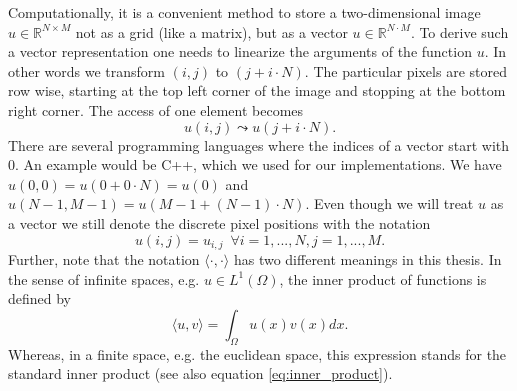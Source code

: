     Computationally, it is a convenient method to store a two-dimensional image $u \in \mathbb{R}^{N \times M}$ not as a grid (like a matrix), but as a vector $u \in \mathbb{R}^{N \cdot M}$. To derive such a vector representation one needs to linearize the arguments of the function $u$. In other words we transform $(i, j)$ to $(j + i \cdot N)$. %
    The particular pixels are stored row wise, starting at the top left corner of the image and stopping at the bottom right corner. The access of one element becomes
        $$
            u(i, j) \leadsto u(j + i \cdot N).
        $$
    There are several programming languages where the indices of a vector start with $0$. An example would be C++, which we used for our implementations. We have $u(0, 0) = u(0 + 0 \cdot N) = u(0)$ and $u(N-1, M-1) = u(M-1 + (N-1) \cdot N)$. Even though we will treat $u$ as a vector we still denote the discrete pixel positions with the notation
        $$
            u(i, j) = u_{i, j} \,\,\, \forall i = 1, ..., N, j = 1, ..., M.
        $$
    Further, note that the notation $\langle \cdot, \cdot \rangle$ has two different meanings in this thesis. In the sense of infinite spaces, e.g. $u \in L^{1}(\Omega)$, the inner product of functions is defined by
        $$
            \langle u, v \rangle = \int_{\Omega} u(x)v(x) dx.
        $$
    Whereas, in a finite space, e.g. the euclidean space, this expression stands for the standard inner product (see also equation \ref{eq:inner_product}).


